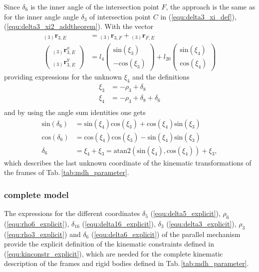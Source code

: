 \documentclass[letterpaper, 10 pt, conference]{ieeeconf}  %
\newcommand{\ortvek}[3]{{ }_{(#1)}{\boldsymbol{r}}^{#2}_{#3}}
\begin{document}
Since $\delta_6$ is the inner angle of the intersection point $F$, the approach is the same as for the inner angle angle $\delta_3$ of intersection point $C$ in (\ref{equ:delta3_xi_def}), (\ref{equ:delta3_xi2_addtheorem}). With the vector
%
\begin{align}
\ortvek{3}{}{3,E} &= \ortvek{3}{}{3,F} + \ortvek{3}{}{F,E} \\
\begin{pmatrix}\ortvek{3}{x}{3,E}\\ \ortvek{3}{y}{3,E} \end{pmatrix} &= l_{4}\begin{pmatrix}\mathrm{sin}(\xi_3)\\ -\mathrm{cos}(\xi_3) \end{pmatrix} + l_{20}\begin{pmatrix}\mathrm{sin}(\xi_4)\\ \mathrm{cos}(\xi_4) \end{pmatrix}
\label{equ:delta6_r33E}
\end{align}
%
providing expressions for the unknown $\xi_4$ and the definitions
%
\begin{align}
\xi_3 &= -\rho_3+\delta_{8} \nonumber \\
\xi_4 &= -\rho_3+\delta_{8}+\delta_{6} \nonumber \\
\label{equ:delta6_xi_def}
\end{align}
%
and by using the angle sum identities one gets
%
\begin{align}
\mathrm{sin}(\delta_6) &= \mathrm{sin}(\xi_4)\mathrm{cos}(\xi_3)+\mathrm{cos}(\xi_4)\mathrm{sin}(\xi_3)\\
\mathrm{cos}(\delta_6) &= \mathrm{cos}(\xi_4)\mathrm{cos}(\xi_3)-\mathrm{sin}(\xi_4)\mathrm{sin}(\xi_3)\\
\delta_6 &= \xi_4 + \xi_3 =  \mathrm{atan2}(\mathrm{sin}(\xi_4),\mathrm{cos}(\xi_4)) + \xi_3,
\label{equ:delta6_explicit}
\end{align}
%
which describes the last unknown coordinate of the kinematic transformations of the frames of Tab.\,\ref{tab:mdh_parameter}.
%

\subsubsection{complete model}

The expressions for the different coordinates $\delta_5$ (\ref{equ:delta5_explicit}), $\rho_6$ (\ref{equ:rho6_explicit}),  $\delta_{16}$ (\ref{equ:delta16_explicit}), $\delta_3$ (\ref{equ:delta3_explicit}), $\rho_3$ (\ref{equ:rho3_explicit}) and $\delta_6$ (\ref{equ:delta6_explicit}) of the parallel mechanism provide the explicit definition of the kinematic constraints defined in (\ref{equ:kinconstr_explicit}), which are needed for the complete kinematic description of the frames and rigid bodies defined in Tab.\,\ref{tab:mdh_parameter}.
\end{document}

